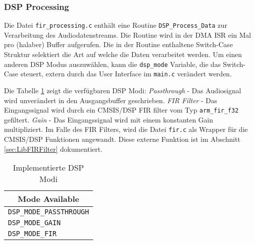 \subsubsection{DSP Processing}
\label{sec:LibDSPProcessing}

Die Datei \texttt{fir\_processing.c} enthält eine Routine \texttt{DSP\_Process\_Data} zur Verarbeitung des Audiodatenstreams. Die Routine wird in der DMA ISR ein Mal pro (halaber) Buffer aufgerufen.
Die in der Routine enthaltene Switch-Case Struktur selektiert die Art auf welche die Daten verarbeitet werden. 
Um einen anderen DSP Modus auszuwählen, kann die \texttt{dsp\_mode} Variable, die das Switch-Case steuert, extern durch das User Interface im \texttt{main.c} verändert werden.

Die Tabelle \ref{tab:DSP_Modes} zeigt die verfügbaren DSP Modi: \textit{Passthrough} - Das Audiosignal wird unverändert in den Ausgangsbuffer geschrieben. \textit{FIR Filter} - Das Eingangssignal wird durch ein CMSIS/DSP FIR filter vom Typ \texttt{arm\_fir\_f32} gefiltert. \textit{Gain} - Das Eingangssignal wird mit einem konstanten Gain multipliziert.
Im Falle des FIR Filters, wird die Datei \texttt{fir.c} als Wrapper für die CMSIS/DSP Funktionen angewandt. Diese externe Funktion ist im Abschnitt \ref{sec:LibFIRFilter} dokumentiert.

\begin{table}[H]
	\centering
	\begin{tabular}{|l|}
		\hline
		\multicolumn{1}{|c|}{\textbf{Mode Available}} \\ \hline
		\texttt{DSP\_MODE\_PASSTHROUGH}                        \\ \hline
		\texttt{DSP\_MODE\_GAIN}                               \\ \hline
		\texttt{DSP\_MODE\_FIR}                                \\ \hline
	\end{tabular}
	\caption{Implementierte DSP Modi}
	\label{tab:DSP_Modes}
\end{table}


